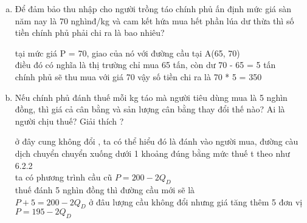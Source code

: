 \begin{enumerate}[a.]
  \item Để đảm bảo thu nhập cho người trồng táo chính phủ ấn định mức giá sàn năm nay
        là 70 nghìnđ/kg và cam kết hứa mua hết phần lúa dư thừa thì số tiền chính phủ phải
        chi ra là bao nhiêu?


        tại mức giá P = 70, giao của nó với đường cầu tại A(65, 70)\\
        điều đó có nghĩa là thị trường chỉ mua 65 tấn, còn dư 70 - 65 = 5 tấn\\
        chính phủ sẽ thu mua với giá 70 vậy số tiền chi ra là 70 * 5 = 350

  \item Nếu chính phủ đánh thuế mỗi kg táo mà người tiêu dùng mua là 5 nghìn đồng, thì
        giá cả cân bằng và sản lượng cân bằng thay đổi thế nào? Ai là người chịu thuế? Giải
        thích ?

        ở đây cung không đổi , ta có thể hiểu đó là đánh vào người mua, đường càu dịch chuyển chuyển xuống dưới
        1 khoảng đúng bằng
        mức thuế t theo như 6.2.2\\
        ta có phương trình cầu cũ $P = 200 - 2Q_D$ \\
        thuế đánh 5 nghìn đồng thì đường cầu mới sẽ là \\
        $P + 5 = 200 - 2Q_D$  ở đâu lượng cầu không đổi nhưng giá tăng thêm 5 đơn vị\\
        $P = 195 - 2Q_D$


\end{enumerate}
